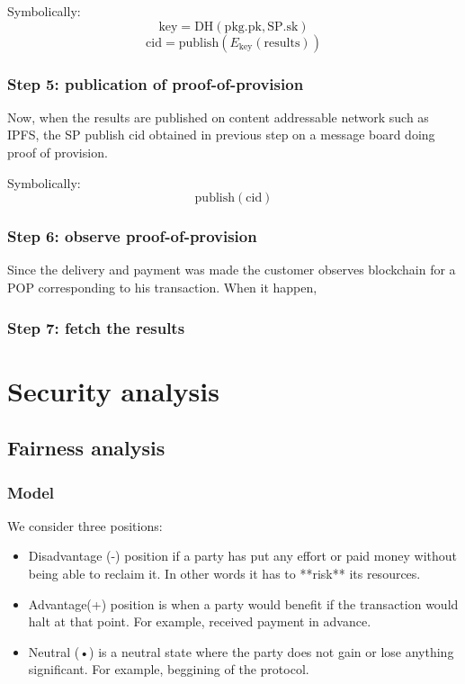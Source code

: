 \documentclass{article}
\begin{document}
Symbolically:
$$\mathrm{key} = \mathrm{DH}(\mathrm{pkg}.\mathrm{pk}, \mathrm{SP}.\mathrm{sk})$$
$$\mathrm{cid} = \mathrm{publish}(E_\mathrm{key}(\mathrm{results}))$$

\subsubsection{Step 5: publication of proof-of-provision}
Now, when the results are published on content addressable network such as IPFS, the SP publish $\mathrm{cid}$ obtained in previous step on a message board doing proof of provision. 

Symbolically:
$$\mathrm{publish}(\mathrm{cid})$$

\subsubsection{Step 6: observe proof-of-provision}

Since the delivery and payment was made the customer observes blockchain for a POP corresponding to his transaction. When it happen,   

\subsubsection{Step 7: fetch the results}




\section{Security analysis}
\subsection{Fairness analysis}
\subsubsection{Model}
We consider three positions:
\begin{itemize}
    \item Disadvantage (-) position if a party has put any effort or paid money without being able to reclaim it. In other words it has to **risk** its resources.
    \item Advantage(+) position is when a party would benefit if the transaction would halt at that point. For example, received payment in advance.
    \item Neutral (•) is a neutral state where the party does not gain or lose anything significant. For example, beggining of the protocol.
\end{itemize}
\end{document}
